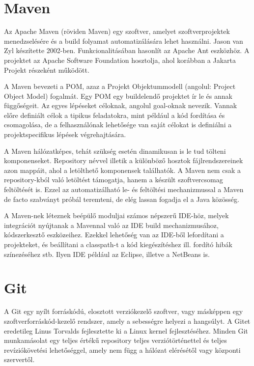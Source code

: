 \documentclass[a4paper,12pt]{report}
\begin{document}
\newpage
\section{Maven}
\label{maven}

Az Apache Maven (röviden Maven) egy szoftver, amelyet szoftverprojektek menedzselésére és a build folyamat automatizálására lehet használni. Jason van Zyl készítette 2002-ben. Funkcionalitásában hasonlít az Apache Ant eszközhöz. A projektet az Apache Software Foundation hosztolja, ahol korábban a Jakarta Projekt részeként működött.

\vspace{2mm}
A Maven bevezeti a POM, azaz a Projekt Objektummodell (angolul: Project Object Model) fogalmát. Egy POM egy buildelendő projektet ír le és annak függőségeit. Az egyes lépéseket céloknak, angolul goal-oknak nevezik. Vannak előre definiált célok a tipikus feladatokra, mint például a kód fordítása és csomagolása, de a felhasználónak lehetősége van saját célokat is definiálni a projektspecifikus lépések végrehajtására.

\vspace{2mm}
A Maven hálózatképes, tehát szükség esetén dinamikusan is le tud tölteni komponenseket. Repository névvel illetik a különböző hosztok fájlrendszereinek azon mappáit, ahol a letölthető komponensek találhatók. A Maven nem csak a repository-kból való letöltést támogatja, hanem a készült szoftvercsomag feltöltését is. Ezzel az automatizálható le- és feltöltési mechanizmussal a Maven de facto szabványt próbál teremteni, de elég lassan fogadja el a Java közösség.

\vspace{2mm}
A Maven-nek léteznek beépülő moduljai számos népszerű IDE-höz, melyek integrációt nyújtanak a Mavennal való az IDE build mechanizmusához, kódszerkesztő eszközeihez. Ezekkel lehetőség van az IDE-ből lefordítani a projekteket, és beállítani a classpath-t a kód kiegészítéshez ill. fordító hibák színezéséhez stb. Ilyen IDE például az Eclipse, illetve a NetBeans is.

\newpage
\section{Git}
\label{git}

A Git egy nyílt forráskódú, elosztott verziókezelő szoftver, vagy másképpen egy szoftverforráskód-kezelő rendszer, amely a sebességre helyezi a hangsúlyt. A Gitet eredetileg Linus Torvalds fejlesztette ki a Linux kernel fejlesztéséhez. Minden Git munkamásolat egy teljes értékű repository teljes verziótörténettel és teljes revíziókövetési lehetőséggel, amely nem függ a hálózat elérésétől vagy központi szervertől.
\end{document}
